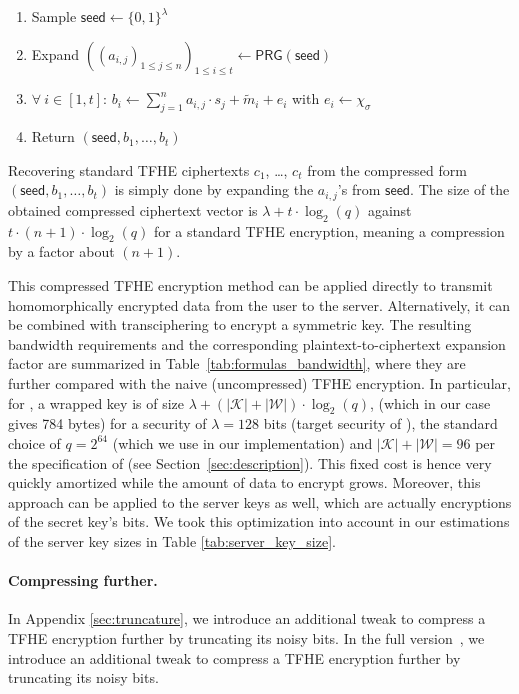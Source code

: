 \smallskip
\else
  \begin{enumerate}
  \item Sample $\mathsf{seed} \gets \{0,1\}^\lambda$
    \smallskip
  \item Expand $((a_{i,j})_{1 \leq j \leq n})_{1 \leq i \leq t} \gets \mathsf{PRG}(\mathsf{seed})$
    \smallskip
  \item $\forall \:i \in [1,t]$: $b_i \gets \sum_{j=1}^n a_{i,j} \cdot s_j + \tilde{m}_i + e_i$ with $e_i \gets \chi_{\sigma}$
    \smallskip
  \item Return $(\mathsf{seed}, b_1, \ldots, b_t)$
  \end{enumerate}
\fi

Recovering standard TFHE ciphertexts $c_1$, \ldots, $c_t$ from the compressed form $(\mathsf{seed}, b_1, \ldots, b_t)$ is simply done by expanding the $a_{i,j}$'s from $\mathsf{seed}$. The size of the obtained compressed ciphertext vector is $\lambda + t \cdot \log_2(q)$ against $t \cdot (n+1) \cdot \log_2(q)$ for a standard TFHE encryption, meaning a compression by a factor about $(n+1)$. 

This compressed TFHE encryption method can be applied directly to transmit homomorphically encrypted data from the user to the server. Alternatively, it can be combined with transciphering to encrypt a symmetric key. The resulting bandwidth requirements and the corresponding plaintext-to-ciphertext expansion factor are summarized in Table~\ref{tab:formulas_bandwidth}, where they are further compared with the naive (uncompressed) TFHE encryption. In particular, for \coolName, a wrapped key is of size $\lambda + (|\mathcal K| + |\mathcal W|) \cdot \log_2(q)$, (which in our case gives 784 bytes) for a security of $\lambda = 128$ bits (target security of \coolName), the standard choice of $q= 2^{64}$ (which we use in our implementation) and $|\mathcal K| + |\mathcal W| = 96$ per the specification of \coolName (see Section~\ref{sec:description}). This fixed cost is hence very quickly amortized while the amount of data to encrypt grows.
Moreover, this approach can be applied to the server keys as well, which are actually encryptions of the secret key's bits. \ifeprint We took this optimization into account in our estimations of the server key sizes in Table \ref{tab:server_key_size}. 
\paragraph{Compressing further.}
In Appendix \ref{sec:truncature}, we introduce an additional tweak to compress a TFHE encryption further by truncating its noisy bits.
\else
In the full version~\cite{EPRINT:BBBBCL25}, we introduce an additional tweak to compress a TFHE encryption further by truncating its noisy bits.
\fi


